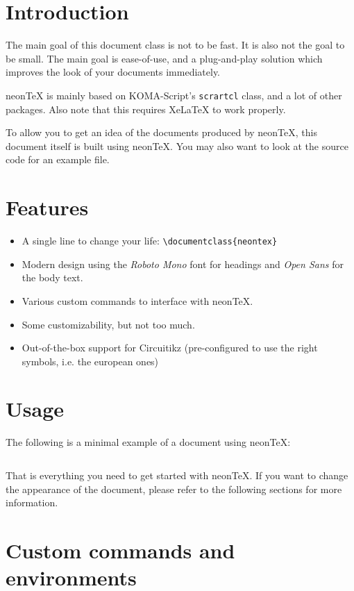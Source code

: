 \documentclass{neontex}
\begin{document}
	\neontitlepage
	\tableofcontents

	\section{Introduction}

	The main goal of this document class is not to be fast. It is also not the goal to be small. The main goal is ease-of-use, and a plug-and-play solution which improves the look of your documents immediately.

	neonTeX is mainly based on KOMA-Script's \texttt{scrartcl} class, and a lot of other packages. Also note that this requires XeLaTeX to work properly.

	To allow you to get an idea of the documents produced by neonTeX, this document itself is built using neonTeX. You may also want to look at the source code for an example file.

	\section{Features}
	\begin{itemize}
		\item A single line to change your life: \texttt{\textbackslash documentclass\{neontex\}}
		\item Modern design using the \textit{Roboto Mono} font for headings and \textit{Open Sans} for the body text.
		\item Various custom commands to interface with neonTeX.
		\item Some customizability, but not too much.
		\item Out-of-the-box support for Circuitikz (pre-configured to use the right symbols, i.e. the european ones)
	\end{itemize}

	\section{Usage}
	The following is a minimal example of a document using neonTeX:
	\inputminted{latex}{usage.tex}
	That is everything you need to get started with neonTeX. If you want to change the appearance of the document, please refer to the following sections for more information.

	\section{Custom commands and environments}
\end{document}
